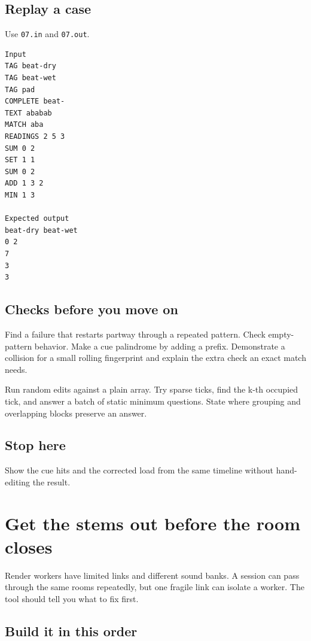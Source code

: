 \documentclass[11pt,letterpaper]{article}
\begin{document}
\subsection*{Replay a case}

Use \texttt{07.in} and \texttt{07.out}.

\begin{samepage}
\small
\begin{verbatim}
Input
TAG beat-dry
TAG beat-wet
TAG pad
COMPLETE beat-
TEXT ababab
MATCH aba
READINGS 2 5 3
SUM 0 2
SET 1 1
SUM 0 2
ADD 1 3 2
MIN 1 3

Expected output
beat-dry beat-wet
0 2
7
3
3
\end{verbatim}
\end{samepage}

\subsection*{Checks before you move on}

Find a failure that restarts partway through a repeated pattern. Check empty-pattern behavior. Make a cue palindrome by adding a prefix. Demonstrate a collision for a small rolling fingerprint and explain the extra check an exact match needs.

Run random edits against a plain array. Try sparse ticks, find the k-th occupied tick, and answer a batch of static minimum questions. State where grouping and overlapping blocks preserve an answer.

\subsection*{Stop here}

Show the cue hits and the corrected load from the same timeline without hand-editing the result.

\clearpage

\section{Get the stems out before the room closes}\label{groovebox:08}

Render workers have limited links and different sound banks. A session can pass through the same rooms repeatedly, but one fragile link can isolate a worker. The tool should tell you what to fix first.

\subsection*{Build it in this order}
\end{document}
